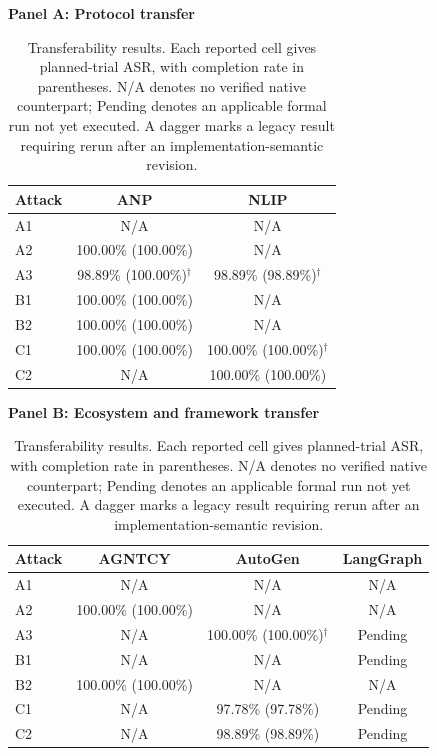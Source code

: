 \begin{table}[t]
\centering
\small
\setlength{\tabcolsep}{7pt}
\renewcommand{\arraystretch}{1.08}
\textbf{Panel A: Protocol transfer}\\[2pt]
\begin{tabular}{lcc}
\toprule
Attack & ANP & NLIP \\
\midrule
A1 & N/A & N/A \\
A2 & 100.00\% (100.00\%) & N/A \\
A3 & 98.89\% (100.00\%)$^\dagger$ & 98.89\% (98.89\%)$^\dagger$ \\
B1 & 100.00\% (100.00\%) & N/A \\
B2 & 100.00\% (100.00\%) & N/A \\
C1 & 100.00\% (100.00\%) & 100.00\% (100.00\%)$^\dagger$ \\
C2 & N/A & 100.00\% (100.00\%) \\
\bottomrule
\end{tabular}
\vspace{5pt}
\textbf{Panel B: Ecosystem and framework transfer}\\[2pt]
\begin{tabular}{lccc}
\toprule
Attack & AGNTCY & AutoGen & LangGraph \\
\midrule
A1 & N/A & N/A & N/A \\
A2 & 100.00\% (100.00\%) & N/A & N/A \\
A3 & N/A & 100.00\% (100.00\%)$^\dagger$ & Pending \\
B1 & N/A & N/A & Pending \\
B2 & 100.00\% (100.00\%) & N/A & N/A \\
C1 & N/A & 97.78\% (97.78\%) & Pending \\
C2 & N/A & 98.89\% (98.89\%) & Pending \\
\bottomrule
\end{tabular}
\caption{Transferability results. Each reported cell gives planned-trial ASR, with completion rate in parentheses. N/A denotes no verified native counterpart; Pending denotes an applicable formal run not yet executed. A dagger marks a legacy result requiring rerun after an implementation-semantic revision.}
\label{tab:transferability}
\end{table}
